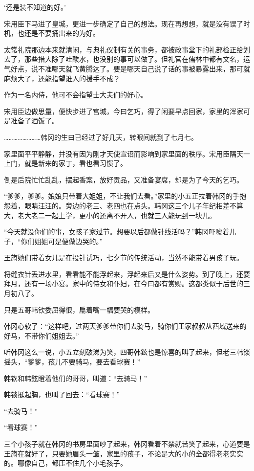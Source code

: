‘还是装不知道的好。’

宋用臣下马进了皇城，更进一步确定了自己的想法。现在再想想，就是没有误了时机，也还是不要捅出来的为好。

太常礼院那边本来就清闲，与典礼仪制有关的事务，都被政事堂下的礼部检正给划去了，那些措大除了吐酸水，也没别的事可以做了。但礼官在儒林中都有文名，运气好点，说不准哪天就飞黄腾达了。要是哪天自己说了话的事被暴露出来，那可就麻烦大了，还能指望谁人的援手不成？

作为一名内侍，他可不会指望士大夫们的好心。

宋用臣边做思量，便快步进了宫城，今曰乞巧，得了闲要早点回家，家里的浑家可是准备了酒饭了。

……………………韩冈的生曰已经过了好几天，转眼间就到了七月七。

家里面平平静静，并没有因为刚才天使宣诏而影响到家里面的秩序。宋用臣隔天一上门，就是新来的家丁，看也看习惯了。

倒是后院忙忙乱乱，摆起香案，放好贡品，又准备宴席，却是为了今天的乞巧。

“爹爹，爹爹。娘娘只带着大姐姐，不让我们去看。”家里的小五正拉着韩冈的手抱怨着，眼睛汪汪的。旁边的老三、老四也在点头。韩冈这三个儿子年纪相差不算大，老大老二一起上学，更小的还离不开人，也就三人能玩到一块儿。

“今天就没你们的事，女孩子家过节。想要以后都做针线活吗？”韩冈吓唬着儿子，“你们姐姐可是便做边哭的。”

王旖她们带着女儿是在投针试巧，七夕节的传统活动，当然不能带着男孩子玩。

将缝衣针丢进水里，看看能不能浮起来，浮起来后又是什么姿势。到了晚上，还要拜月，还有一场小宴。家中的侍女和仆妇，在今曰都有赏赐。这都类似于后世的三月初八了。

只是五哥韩钦委屈得很，扁着嘴一幅要哭的模样。

韩冈心软了：“这样吧，过两天爹爹带你们去骑马，骑你们王家叔叔从西域送来的好马，不带你们姐姐去。”

听韩冈这么一说，小五立刻破涕为笑，四哥韩鉉也是惊喜的叫了起来，但老三韩锬摇头，“爹爹，孩儿不要骑马，要去看球赛！”

韩钦和韩鉉瞪着他们的哥哥，叫道：“去骑马！”

韩锬挺起胸，也叫了回去：“看球赛！”

“去骑马！”

“看球赛！”

三个小孩子就在韩冈的书房里面吵了起来，韩冈看着不禁就苦笑了起来，心道要是王旖在就好了，只要她眉头一皱，家里的孩子，不论是大的小的全都得老老实实的。哪像自己，都压不住几个小毛孩子。

